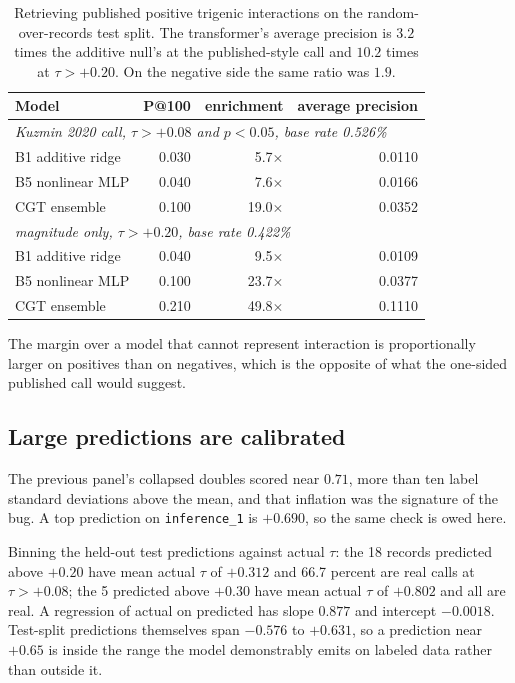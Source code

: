 \begin{table}[H]
\centering
\begin{tabular}{lrrr}
\toprule
Model & P@100 & enrichment & average precision \\
\midrule
\multicolumn{4}{l}{\emph{Kuzmin 2020 call, $\tau > +0.08$ and $p < 0.05$, base rate 0.526\%}} \\
B1 additive ridge & 0.030 & 5.7$\times$  & 0.0110 \\
B5 nonlinear MLP  & 0.040 & 7.6$\times$  & 0.0166 \\
CGT ensemble      & 0.100 & 19.0$\times$ & 0.0352 \\
\midrule
\multicolumn{4}{l}{\emph{magnitude only, $\tau > +0.20$, base rate 0.422\%}} \\
B1 additive ridge & 0.040 & 9.5$\times$  & 0.0109 \\
B5 nonlinear MLP  & 0.100 & 23.7$\times$ & 0.0377 \\
CGT ensemble      & 0.210 & 49.8$\times$ & 0.1110 \\
\bottomrule
\end{tabular}
\caption{Retrieving published positive trigenic interactions on the
random-over-records test split. The transformer's average precision is
$3.2$ times the additive null's at the published-style call and $10.2$ times at
$\tau > +0.20$. On the negative side the same ratio was $1.9$.}
\end{table}

The margin over a model that cannot represent interaction is proportionally
larger on positives than on negatives, which is the opposite of what the
one-sided published call would suggest.

\subsection{Large predictions are calibrated}

The previous panel's collapsed doubles scored near $0.71$, more than ten label
standard deviations above the mean, and that inflation was the signature of the
bug. A top prediction on \texttt{inference\_1} is $+0.690$, so the same check is
owed here.

Binning the held-out test predictions against actual $\tau$: the 18 records
predicted above $+0.20$ have mean actual $\tau$ of $+0.312$ and 66.7 percent are
real calls at $\tau > +0.08$; the 5 predicted above $+0.30$ have mean actual
$\tau$ of $+0.802$ and all are real. A regression of actual on predicted has
slope $0.877$ and intercept $-0.0018$. Test-split predictions themselves span
$-0.576$ to $+0.631$, so a prediction near $+0.65$ is inside the range the model
demonstrably emits on labeled data rather than outside it.

